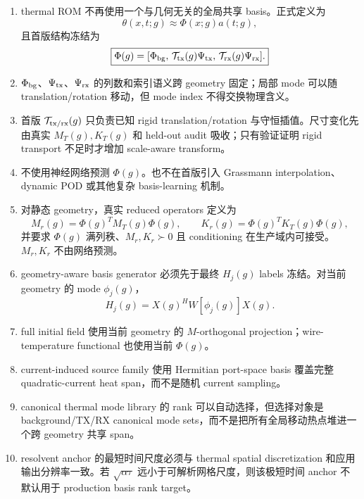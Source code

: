 \begin{enumerate}
  \item thermal ROM 不再使用一个与几何无关的全局共享 basis。正式定义为
  \begin{equation}
  \boxed{
  \theta(x,t;g)\approx\Phi(x;g)a(t;g),
  }
  \end{equation}
  且首版结构冻结为
  \begin{equation}
  \boxed{
  \Phi(g)=
  [\Phi_{\rm bg},\,\mathcal T_{\rm tx}(g)\Psi_{\rm tx},\,\mathcal T_{\rm rx}(g)\Psi_{\rm rx}].
  }
  \end{equation}
  \item $\Phi_{\rm bg}$、$\Psi_{\rm tx}$、$\Psi_{\rm rx}$ 的列数和索引语义跨 geometry 固定；局部 mode 可以随 translation/rotation 移动，但 mode index 不得交换物理含义。
  \item 首版 $\mathcal T_{\rm tx/rx}(g)$ 只负责已知 rigid translation/rotation 与守恒插值。尺寸变化先由真实 $M_T(g),K_T(g)$ 和 held-out audit 吸收；只有验证证明 rigid transport 不足时才增加 scale-aware transform。
  \item 不使用神经网络预测 $\Phi(g)$。也不在首版引入 Grassmann interpolation、dynamic POD 或其他复杂 basis-learning 机制。
  \item 对静态 geometry，真实 reduced operators 定义为
  \begin{equation}
  M_r(g)=\Phi(g)^TM_T(g)\Phi(g),
  \qquad
  K_r(g)=\Phi(g)^TK_T(g)\Phi(g),
  \end{equation}
  并要求 $\Phi(g)$ 满列秩、$M_r,K_r\succ0$ 且 conditioning 在生产域内可接受。$M_r,K_r$ 不由网络预测。
  \item geometry-aware basis generator 必须先于最终 $H_j(g)$ labels 冻结。对当前 geometry 的 mode $\phi_j(g)$，
  \begin{equation}
  H_j(g)=X(g)^H W[\phi_j(g)]X(g).
  \end{equation}
  \item full initial field 使用当前 geometry 的 $M$-orthogonal projection；wire-temperature functional 也使用当前 $\Phi(g)$。
  \item current-induced source family 使用 Hermitian port-space basis 覆盖完整 quadratic-current heat span，而不是随机 current sampling。
  \item canonical thermal mode library 的 rank 可以自动选择，但选择对象是 background/TX/RX canonical mode sets，而不是把所有全局移动热点堆进一个跨 geometry 共享 span。
  \item resolvent anchor 的最短时间尺度必须与 thermal spatial discretization 和应用输出分辨率一致。若 $\sqrt{\alpha\tau}$ 远小于可解析网格尺度，则该极短时间 anchor 不默认用于 production basis rank target。

\end{enumerate}
